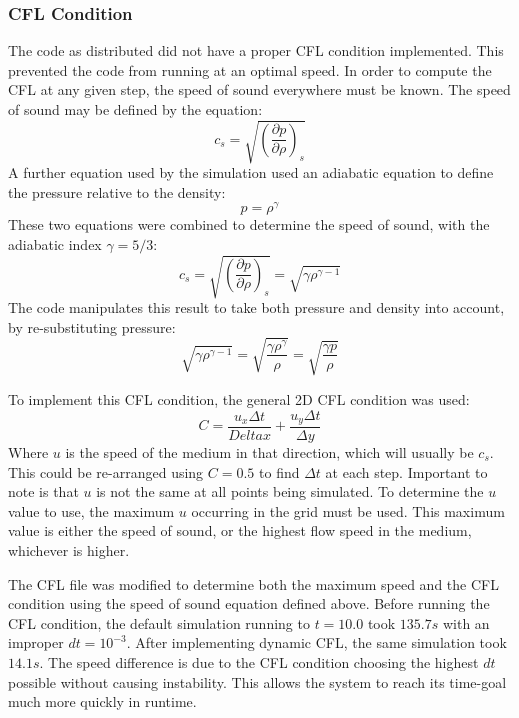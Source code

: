\documentclass[twocolumn]{article}
\begin{document}
\subsubsection{CFL Condition}
The code as distributed did not have a proper CFL condition implemented. This prevented the code from running at an optimal speed. In order to compute the CFL at any given step, the speed of sound everywhere must be known. The speed of sound may be defined by the equation:
\begin{equation}
c_s = \sqrt{(\frac{\partial p}{\partial \rho})_s}
\end{equation}
A further equation used by the simulation used an adiabatic equation to define the pressure relative to the density:
\begin{equation}
p = \rho^\gamma
\end{equation}
These two equations were combined to determine the speed of sound, with the adiabatic index $\gamma = 5/3$:
\begin{equation}
c_s = \sqrt{(\frac{\partial p}{\partial \rho})_s} = \sqrt{\gamma \rho^{\gamma-1}}
\end{equation}
The code manipulates this result to take both pressure and density into account, by re-substituting pressure:
\begin{equation}
\sqrt{\gamma \rho^{\gamma-1}} = \sqrt{\frac{\gamma \rho^\gamma}{\rho}} = \sqrt{\frac{\gamma p}{\rho}}
\end{equation}

To implement this CFL condition, the general 2D CFL condition was used:
\begin{equation}
C = \frac{u_x \Delta t}{Delta x} + \frac{u_y \Delta t}{\Delta y}
\end{equation}
Where $u$ is the speed of the medium in that direction, which will usually be $c_s$. This could be re-arranged using $C=0.5$ to find $\Delta t$ at each step. Important to note is that $u$ is not the same at all points being simulated. To determine the $u$ value to use, the maximum $u$ occurring in the grid must be used. This maximum value is either the speed of sound, or the highest flow speed in the medium, whichever is higher. 

The CFL file was modified to determine both the maximum speed and the CFL condition using the speed of sound equation defined above. Before running the CFL condition, the default simulation running to $t=10.0$ took $135.7s$ with an improper $dt=10^{-3}$. After implementing dynamic CFL, the same simulation took $14.1s$. The speed difference is due to the CFL condition choosing the highest $dt$ possible without causing instability. This allows the system to reach its time-goal much more quickly in runtime. 
\end{document}
